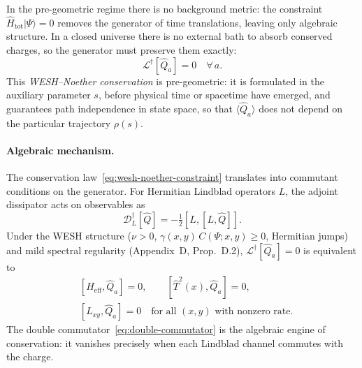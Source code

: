 \documentclass[12pt,a4paper]{article}
\numberwithin{equation}{section}
\begin{document}
In the pre-geometric regime there is no background metric: the constraint 
$\hat{H}_{\mathrm{tot}}|\Psi\rangle = 0$ removes the generator of time 
translations, leaving only algebraic structure. In a closed universe 
there is no external bath to absorb conserved charges, so the generator 
must preserve them exactly:
\begin{equation}
\mathcal{L}^\dagger[\hat{Q}_a] = 0 \quad \forall\, a.
\label{eq:wesh-noether-constraint}
\end{equation}
This \emph{WESH--Noether conservation} is pre-geometric: it is formulated
in the auxiliary parameter $s$, before physical time or spacetime have
emerged, and guarantees path independence in state space, so that
$\langle\hat{Q}_a\rangle$ does not depend on the particular trajectory
$\rho(s)$.

\paragraph{Algebraic mechanism.}
The conservation law~\eqref{eq:wesh-noether-constraint} translates into 
commutant conditions on the generator. For Hermitian Lindblad operators 
$L$, the adjoint dissipator acts on observables as
\begin{equation}
\mathcal{D}^\dagger_L[\hat{Q}] = -\tfrac{1}{2}[L,[L,\hat{Q}]].
\label{eq:double-commutator}
\end{equation}
Under the WESH structure ($\nu>0$, $\gamma(x,y)\,C(\Psi;x,y)\ge 0$, Hermitian 
jumps) and mild spectral regularity (Appendix~D, Prop.~D.2), 
$\mathcal{L}^\dagger[\hat{Q}_a] = 0$ is equivalent to
\begin{equation}
\begin{split}
&[H_{\mathrm{eff}}, \hat{Q}_a] = 0, \qquad 
[\hat{T}^2(x), \hat{Q}_a] = 0, \\
&[L_{xy}, \hat{Q}_a] = 0 \quad \text{for all $(x,y)$ with nonzero rate}.
\end{split}
\label{eq:commutant-conditions}
\end{equation}
The double commutator~\eqref{eq:double-commutator} is the algebraic engine 
of conservation: it vanishes precisely when each Lindblad channel commutes 
with the charge.
\end{document}
